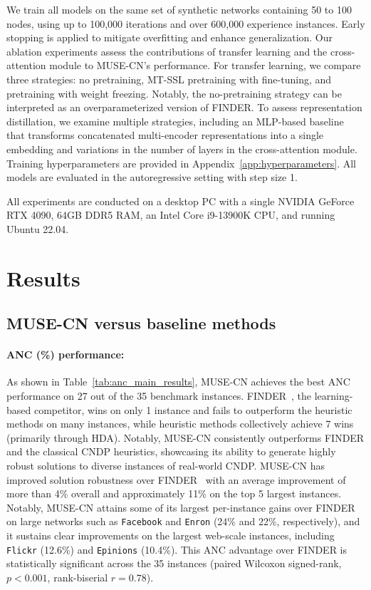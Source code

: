 \documentclass{article}
\begin{document}
We train all models on the same set of synthetic networks containing 50 to 100 nodes, using up to 100,000 iterations and over 600,000 experience instances. Early stopping is applied to mitigate overfitting and enhance generalization. Our ablation experiments assess the contributions of transfer learning and the cross-attention module to MUSE-CN's performance. For transfer learning, we compare three strategies: no pretraining, MT-SSL pretraining with fine-tuning, and pretraining with weight freezing. Notably, the no-pretraining strategy can be interpreted as an overparameterized version of FINDER. To assess representation distillation, we examine multiple strategies, including an MLP-based baseline that transforms concatenated multi-encoder representations into a single embedding and variations in the number of layers in the cross-attention module. Training hyperparameters are provided in Appendix~\ref{app:hyperparameters}. All models are evaluated in the autoregressive setting with step size 1. 

All experiments are conducted on a desktop PC with a single NVIDIA GeForce RTX 4090, 64GB DDR5 RAM, an Intel Core i9-13900K CPU, and running Ubuntu 22.04.

\section{Results}


\subsection{MUSE-CN versus baseline methods}
\paragraph{ANC (\%) performance:} As shown in Table~\ref{tab:anc_main_results}, MUSE-CN achieves the best ANC performance on 27 out of the 35 benchmark instances. FINDER~\cite{fan2020finding}, the learning-based competitor, wins on only 1 instance and fails to outperform the heuristic methods on many instances, while heuristic methods collectively achieve 7 wins (primarily through HDA). Notably, MUSE-CN consistently outperforms FINDER and the classical CNDP heuristics, showcasing its ability to generate highly robust solutions to diverse instances of real-world CNDP. MUSE-CN has improved solution robustness over FINDER~\cite{fan2020finding} with an average improvement of more than 4\% overall and approximately 11\% on the top 5 largest instances. Notably, MUSE-CN attains some of its largest per-instance gains over FINDER on large networks such as \texttt{Facebook} and \texttt{Enron} (24\% and 22\%, respectively), and it sustains clear improvements on the largest web-scale instances, including \texttt{Flickr} (12.6\%) and \texttt{Epinions} (10.4\%). This ANC advantage over FINDER is statistically significant across the 35 instances (paired Wilcoxon signed-rank, $p < 0.001$, rank-biserial $r = 0.78$).
\end{document}
